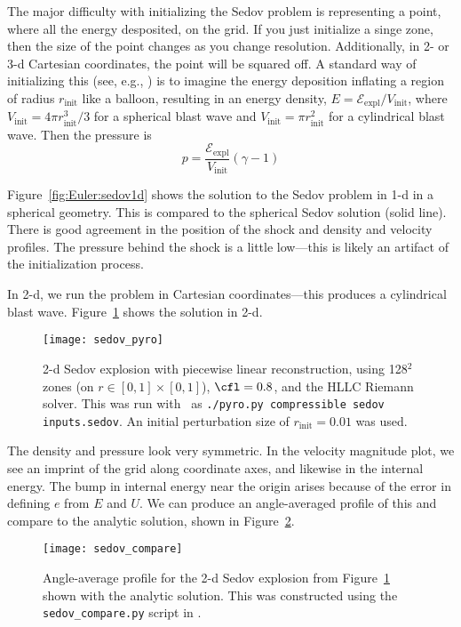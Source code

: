 The major difficulty with initializing the Sedov problem is
representing a point, where all the energy desposited, on the grid.
If you just initialize a singe zone, then the size of the point
changes as you change resolution.  Additionally, in 2- or 3-d
Cartesian coordinates, the point will be squared off.  A standard way
of initializing this (see, e.g., \cite{omang:2006}) is to imagine the
energy deposition inflating a region of radius $r_\mathrm{init}$ like
a balloon, resulting in an energy density, $E =
\mathcal{E}_\mathrm{expl}/V_\mathrm{init}$, where $V_\mathrm{init} =
4\pi r_\mathrm{init}^3/3$ for a spherical blast wave and
$V_\mathrm{init} = \pi r_\mathrm{init}^2$ for a cylindrical blast
wave. Then the pressure is
\begin{equation}
p = \frac{\mathcal{E}_\mathrm{expl}}{V_\mathrm{init}} (\gamma - 1)
\end{equation}


Figure~\ref{fig:Euler:sedov1d} shows the solution to the Sedov problem
in 1-d in a spherical geometry.  This is compared to the spherical
Sedov solution (solid line). There is good agreement in the position of the
shock and density and velocity profiles.  The pressure behind the shock
is a little low---this is likely an artifact of the initialization process.

In 2-d, we run the problem in Cartesian coordinates---this produces a cylindrical
blast wave.  Figure~\ref{fig:Euler:sedov2d} shows the solution in 2-d.
\begin{figure}[t]
\centering
\texttt{[image: sedov\_pyro]}
\caption[2-d cylindrical Sedov problem]{\label{fig:Euler:sedov2d} 2-d Sedov explosion with
  piecewise linear reconstruction, using 128$^2$ zones (on $r \in
  [0,1]\times[0,1]$), $\cfl = 0.8$, and the HLLC Riemann solver.  This was run
  with \pyro\ as {\tt ./pyro.py compressible sedov inputs.sedov}.  An initial
  perturbation size of $r_\mathrm{init} = 0.01$ was used.}
\end{figure}
The density and pressure look very symmetric.  In the velocity magnitude
plot, we see an imprint of the grid along coordinate axes, and likewise
in the internal energy.  The bump in internal energy near the origin arises
because of the error in defining $e$ from $E$ and $U$.  We can produce an angle-averaged
profile of this and compare to the analytic solution, shown in Figure~\ref{fig:Euler:sedov2d_compare}.

\begin{figure}[t]
\centering
\texttt{[image: sedov\_compare]}
\caption[2-d cylindrical Sedov problem]{\label{fig:Euler:sedov2d_compare} Angle-average
  profile for the 2-d Sedov explosion from Figure~\ref{fig:Euler:sedov2d} shown
  with the analytic solution.  This was constructed using the {\tt sedov\_compare.py}
  script in \pyro.}
\end{figure}


